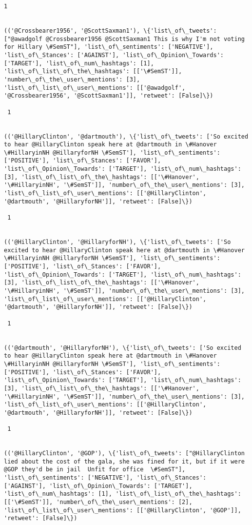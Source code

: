 \documentclass[11pt]{article}
\begin{document}
\begin{Verbatim}[commandchars=\\\{\}]
 1
 

(('@Crossbearer1956', '@ScottSaxman1'), \{'list\_of\_tweets': ["@awadgolf @Crossbearer1956 @ScottSaxman1 This is why I'm not voting for Hillary \#SemST"], 'list\_of\_sentiments': ['NEGATIVE'], 'list\_of\_Stances': ['AGAINST'], 'list\_of\_Opinion\_Towards': ['TARGET'], 'list\_of\_num\_hashtags': [1], 'list\_of\_list\_of\_the\_hashtags': [['\#SemST']], 'number\_of\_the\_user\_mentions': [3], 'list\_of\_list\_of\_user\_mentions': [['@awadgolf', '@Crossbearer1956', '@ScottSaxman1']], 'retweet': [False]\})

 1
 

(('@HillaryClinton', '@dartmouth'), \{'list\_of\_tweets': ['So excited to hear @HillaryClinton speak here at @dartmouth in \#Hanover \#HillaryinNH @HillaryforNH \#SemST'], 'list\_of\_sentiments': ['POSITIVE'], 'list\_of\_Stances': ['FAVOR'], 'list\_of\_Opinion\_Towards': ['TARGET'], 'list\_of\_num\_hashtags': [3], 'list\_of\_list\_of\_the\_hashtags': [['\#Hanover', '\#HillaryinNH', '\#SemST']], 'number\_of\_the\_user\_mentions': [3], 'list\_of\_list\_of\_user\_mentions': [['@HillaryClinton', '@dartmouth', '@HillaryforNH']], 'retweet': [False]\})

 1
 

(('@HillaryClinton', '@HillaryforNH'), \{'list\_of\_tweets': ['So excited to hear @HillaryClinton speak here at @dartmouth in \#Hanover \#HillaryinNH @HillaryforNH \#SemST'], 'list\_of\_sentiments': ['POSITIVE'], 'list\_of\_Stances': ['FAVOR'], 'list\_of\_Opinion\_Towards': ['TARGET'], 'list\_of\_num\_hashtags': [3], 'list\_of\_list\_of\_the\_hashtags': [['\#Hanover', '\#HillaryinNH', '\#SemST']], 'number\_of\_the\_user\_mentions': [3], 'list\_of\_list\_of\_user\_mentions': [['@HillaryClinton', '@dartmouth', '@HillaryforNH']], 'retweet': [False]\})

 1
 

(('@dartmouth', '@HillaryforNH'), \{'list\_of\_tweets': ['So excited to hear @HillaryClinton speak here at @dartmouth in \#Hanover \#HillaryinNH @HillaryforNH \#SemST'], 'list\_of\_sentiments': ['POSITIVE'], 'list\_of\_Stances': ['FAVOR'], 'list\_of\_Opinion\_Towards': ['TARGET'], 'list\_of\_num\_hashtags': [3], 'list\_of\_list\_of\_the\_hashtags': [['\#Hanover', '\#HillaryinNH', '\#SemST']], 'number\_of\_the\_user\_mentions': [3], 'list\_of\_list\_of\_user\_mentions': [['@HillaryClinton', '@dartmouth', '@HillaryforNH']], 'retweet': [False]\})

 1
 

(('@HillaryClinton', '@GOP'), \{'list\_of\_tweets': ["@HillaryClinton lied about the cost of the gala, she was fined for it, but if it were @GOP they'd be in jail  Unfit for office  \#SemST"], 'list\_of\_sentiments': ['NEGATIVE'], 'list\_of\_Stances': ['AGAINST'], 'list\_of\_Opinion\_Towards': ['TARGET'], 'list\_of\_num\_hashtags': [1], 'list\_of\_list\_of\_the\_hashtags': [['\#SemST']], 'number\_of\_the\_user\_mentions': [2], 'list\_of\_list\_of\_user\_mentions': [['@HillaryClinton', '@GOP']], 'retweet': [False]\})


\end{Verbatim}
\end{document}
